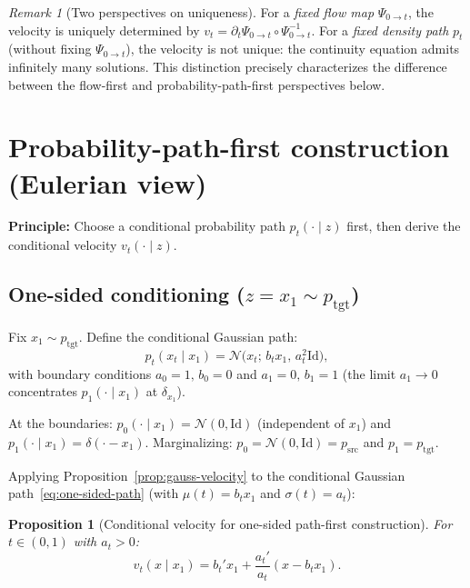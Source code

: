 \documentclass[11pt]{article}
\newcommand{\cN}{\mathcal{N}}
\newcommand{\Id}{\mathrm{Id}}
\newtheorem{proposition}[theorem]{Proposition}
\theoremstyle{definition}
\theoremstyle{remark}
\newtheorem{remark}[theorem]{Remark}
\begin{document}
\begin{remark}[Two perspectives on uniqueness]
For a \emph{fixed flow map} $\Psi_{0\to t}$, the velocity is uniquely determined by $v_t = \partial_t\Psi_{0\to t}\circ\Psi_{0\to t}^{-1}$.
For a \emph{fixed density path} $p_t$ (without fixing $\Psi_{0\to t}$), the velocity is not unique: the continuity equation admits infinitely many solutions.
This distinction precisely characterizes the difference between the flow-first and probability-path-first perspectives below.
\end{remark}

\section{Probability-path-first construction (Eulerian view)}\label{sec:path-first}

\textbf{Principle:} Choose a conditional probability path $p_t(\cdot\mid z)$ first, then derive the conditional velocity $v_t(\cdot\mid z)$.

\subsection{One-sided conditioning ($z = x_1 \sim p_{\mathrm{tgt}}$)}

Fix $x_1\sim p_{\mathrm{tgt}}$.
Define the conditional Gaussian path:
\begin{equation}\label{eq:one-sided-path}
p_t(x_t\mid x_1) = \cN\!\big(x_t;\,b_t x_1,\,a_t^2 \Id\big),
\end{equation}
with boundary conditions $a_0 = 1,\,b_0 = 0$ and $a_1 = 0,\,b_1 = 1$ (the limit $a_1\to 0$ concentrates $p_1(\cdot\mid x_1)$ at $\delta_{x_1}$).

At the boundaries: $p_0(\cdot\mid x_1) = \cN(0,\Id)$ (independent of $x_1$) and $p_1(\cdot\mid x_1) = \delta(\cdot - x_1)$.
Marginalizing: $p_0 = \cN(0,\Id) = p_{\mathrm{src}}$ and $p_1 = p_{\mathrm{tgt}}$.

Applying Proposition~\ref{prop:gauss-velocity} to the conditional Gaussian path~\eqref{eq:one-sided-path} (with $\mu(t) = b_t x_1$ and $\sigma(t) = a_t$):

\begin{proposition}[Conditional velocity for one-sided path-first construction]\label{prop:one-sided-vf}
For $t\in(0,1)$ with $a_t > 0$:
\begin{equation}\label{eq:one-sided-vf}
v_t(x\mid x_1) = b_t' x_1 + \frac{a_t'}{a_t}(x - b_t x_1).
\end{equation}
\end{proposition}
\end{document}
